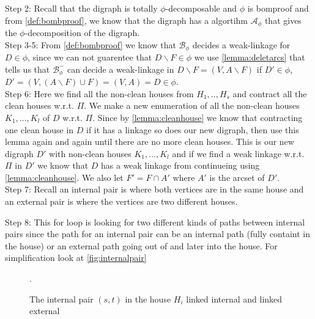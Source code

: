     Step 2: Recall that the digraph is totally $\phi$-decomposable and $\phi$ is bomproof and from \autoref{def:bombproof}, we know that the digraph has a algortihm $\mathcal{A}_{\phi}$ that gives the $\phi$-decomposition of the digraph. \\

    Step 3-5: From \autoref{def:bombproof} we know that $\mathcal{B}_{\phi}$ decides a weak-linkage for $D\in \phi$, since we can not guarentee that $D\backslash F \in \phi$ we use \autoref{lemma:deletarcs} that tells us that $\mathcal{B}_{\phi}^-$ can decide a weak-linkage in $D\backslash F=(V,A\backslash F)$ if $D' \in \phi$, $D'=(V,(A\backslash F)\cup F)=(V,A)=D\in \phi$. \\

    Step 6: Here we find all the non-clean houses from $H_1,..,H_s$ and contract all the clean houses w.r.t. $\Pi$. 
    We make a new enumeration of all the non-clean houses $K_1,\dots ,K_l$ of $D$ w.r.t. $\Pi$.
    Since by \autoref{lemma:cleanhouse} we know that contracting one clean house in $D$ if it has a linkage so does our new digraph, then use this lemma again and again until there are no more clean houses.
    This is our new digraph $D'$ with non-clean houses $K_1,\dots,K_l$ and if we find a weak linkage w.r.t. $\Pi$ in $D'$ we know that $D$ has a weak linkage from continueing using \autoref{lemma:cleanhouse}.
    We also let $F'=F\cap A'$ where $A'$ is the arcset of $D'$.\\

    Step 7: Recall an internal pair is where both vertices are in the same house and an external pair is where the vertices are two different houses. 

    Step 8: This for loop is looking for two different kinds of paths between internal pairs since the path for an internal pair can be an internal path (fully containt in the house) or an external path going out of and later into the house. 
    For simplification look at \autoref{fig:internalpair}
    \begin{figure}
        \caption{The internal pair $(s,t)$ in the house $H_i$ linked internal and linked external}.
        \label{fig:internalpair}
    \end{figure}

